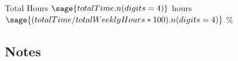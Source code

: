 \documentclass[weekly_log.tex]{subfiles}
\begin{document}
  
  
  \begin{timebox}{Total Hours}
        {$\sage{totalTime.n(digits=4)}$ hours}
      {$\sage{(totalTime / totalWeeklyHours * 100).n(digits=4)}$ \%}
  \end{timebox}
  
  


\subsection{Notes}

\bib{}
\end{document}
